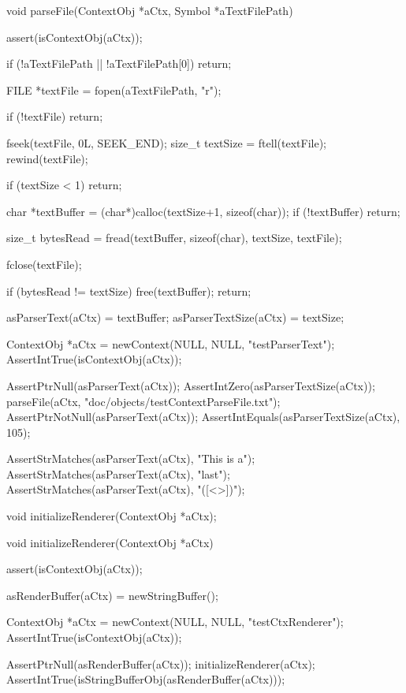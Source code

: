 \startCCode
void parseFile(ContextObj *aCtx, Symbol *aTextFilePath) {
  assert(isContextObj(aCtx));
  
  if (!aTextFilePath || !aTextFilePath[0]) return;
  
  FILE *textFile = fopen(aTextFilePath, "r");
  
  if (!textFile) return;
  
  fseek(textFile, 0L, SEEK_END);
  size_t textSize = ftell(textFile);
  rewind(textFile);
  
  if (textSize < 1) return;
  
  char *textBuffer = (char*)calloc(textSize+1, sizeof(char));
  if (!textBuffer) return;
  
  size_t bytesRead = fread(textBuffer, sizeof(char), textSize, textFile);

  fclose(textFile);
  
  if (bytesRead != textSize) {
    free(textBuffer);
    return;
  }

  asParserText(aCtx)     = textBuffer;
  asParserTextSize(aCtx) = textSize;
}
\stopCCode


\startCTest
  ContextObj *aCtx = newContext(NULL, NULL, "testParserText");
  AssertIntTrue(isContextObj(aCtx));
  
  AssertPtrNull(asParserText(aCtx));
  AssertIntZero(asParserTextSize(aCtx));
  parseFile(aCtx, "doc/objects/testContextParseFile.txt");
  AssertPtrNotNull(asParserText(aCtx));
  AssertIntEquals(asParserTextSize(aCtx), 105);
  
  AssertStrMatches(asParserText(aCtx), "This is a");
  AssertStrMatches(asParserText(aCtx), "last");
  AssertStrMatches(asParserText(aCtx), "([<{}>])");
\stopCTest
\stopTestCase
\stopTestSuite

\startTestSuite[initializeRenderer]

\startCHeader
void initializeRenderer(ContextObj *aCtx);
\stopCHeader

\startCCode
void initializeRenderer(ContextObj *aCtx) {
  assert(isContextObj(aCtx));
  
  asRenderBuffer(aCtx) = newStringBuffer();
}
\stopCCode


\startCTest
  ContextObj *aCtx = newContext(NULL, NULL, "testCtxRenderer");
  AssertIntTrue(isContextObj(aCtx));
  
  AssertPtrNull(asRenderBuffer(aCtx));
  initializeRenderer(aCtx);
  AssertIntTrue(isStringBufferObj(asRenderBuffer(aCtx)));
\stopCTest
\stopTestCase
\stopTestSuite

